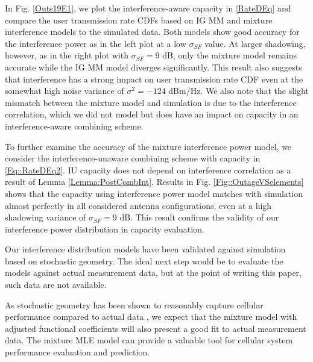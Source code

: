 \documentclass[12pt, draftclsnofoot, onecolumn]{IEEEtran}
\theoremstyle{plain}
\begin{document}
{\color{black} In Fig. \ref{Outs19E1}, we plot the interference-aware capacity in \eqref{RateDEq} and compare the user transmission rate CDFs based on IG MM and mixture interference models to the simulated data. Both models show good accuracy for the interference power as in the left plot at a low $\sigma_{SF}$ value. %
At larger shadowing, however, as in the right plot with $\sigma_{SF}=9$ dB, only the mixture model remains accurate %
while the IG MM model diverges significantly. This result also suggests that interference has a strong impact on user transmission rate CDF even at the somewhat high noise variance of $\sigma^2=-124$ dBm/Hz. We also note that the slight mismatch between the mixture model and simulation is due to the interference correlation, which we did not model but does have an impact on capacity in an interference-aware combining scheme. 

To further examine the accuracy of the mixture interference power model, we consider the interference-unaware combining scheme with capacity in \eqref{Eq::RateDEq2}. IU capacity does not depend on interference correlation as a result of Lemma \ref{Lemma:PostCombInt}. Results in Fig. \ref{Fig::OutageVSelements} shows that the capacity using interference power model matches with simulation almost perfectly in all considered antenna configurations, even at a high shadowing variance of $\sigma_{SF}=9$ dB. This result confirms the validity of our interference power distribution in capacity evaluation.

Our interference distribution models have been validated against simulation based on stochastic geometry. The ideal next step would be to evaluate the models against actual measurement data, but at the point of writing this paper, such data are not available.} As stochastic geometry has been shown to reasonably capture cellular performance compared to actual data \cite{ref_6}, we expect that the mixture model with adjusted functional coefficients will also present a good fit to actual measurement data. The mixture MLE model can provide a valuable tool for cellular system performance evaluation and prediction.%
\end{document}
